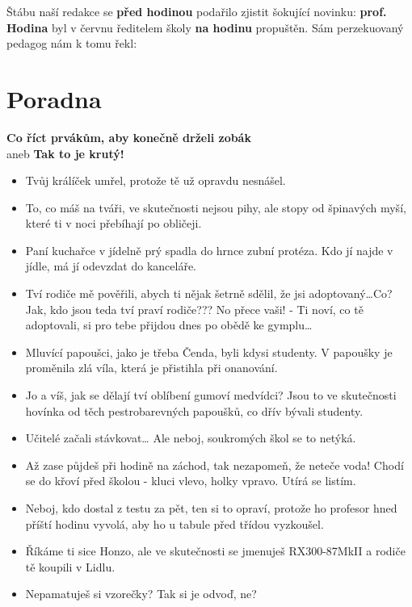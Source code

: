 \documentclass[twoside, 11pt]{article}
\begin{document}
Štábu naší redakce se \textbf{před hodinou} podařilo zjistit šokující novinku:
\textbf{prof. Hodina} byl v červnu ředitelem školy \textbf{na hodinu} propuštěn.
Sám perzekuovaný pedagog nám k tomu řekl: 

\section*{Poradna}
\textbf{Co říct prvákům, aby konečně drželi zobák}\\ aneb \textbf{Tak to je krutý!}
  
\begin{itemize}
    \item Tvůj králíček umřel, protože tě už opravdu nesnášel.
    \item To, co máš na tváři, ve skutečnosti nejsou pihy, ale stopy od špinavých myší, které ti v noci přebíhají po obličeji.
    \item Paní kuchařce v jídelně prý spadla do hrnce zubní protéza. Kdo jí najde v jídle, má jí
    odevzdat do kanceláře.
    \item Tví rodiče mě pověřili, abych ti nějak šetrně sdělil, že jsi adoptovaný\dots Co? Jak, kdo jsou
    teda tví praví rodiče??? No přece vaši! - Ti noví, co tě adoptovali, si pro tebe přijdou dnes
    po obědě ke gymplu\dots
    \item Mluvící papoušci, jako je třeba Čenda, byli kdysi studenty.
    V papoušky je proměnila zlá víla, která je přistihla při
    onanování.
    \item Jo a víš, jak se dělají tví oblíbení gumoví medvídci? Jsou
    to ve skutečnosti hovínka od těch pestrobarevných
    papoušků, co dřív bývali studenty.
    \item Učitelé začali stávkovat\dots \- Ale neboj, soukromých škol se
    to netýká.
    \item Až zase půjdeš při hodině na záchod, tak nezapomeň, že neteče voda! Chodí se do křoví
    před školou - kluci vlevo, holky vpravo. Utírá se listím.
    \item Neboj, kdo dostal z testu za pět, ten si to opraví, protože ho profesor hned příští hodinu
    vyvolá, aby ho u tabule před třídou vyzkoušel.
    \item Říkáme ti sice Honzo, ale ve skutečnosti se jmenuješ RX300-87MkII a rodiče tě koupili
    v Lidlu.
    \item Nepamatuješ si vzorečky? Tak si je odvoď, ne?
\end{itemize}
\end{document}
